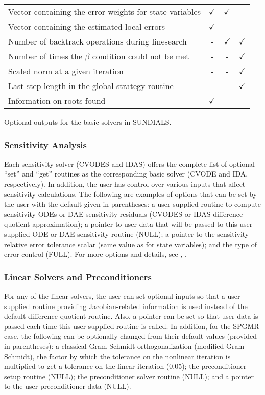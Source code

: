 \begin{acmtable}{327pt}
\begin{tabular}{p{2.75in} c c c }
Vector containing the error weights for state variables & $\checkmark$ & $\checkmark$ & - \\
Vector containing the estimated local errors & $\checkmark$ & - & - \\
Number of backtrack operations during linesearch & - & $\checkmark$ & $\checkmark$ \\
Number of times the $\beta$ condition could not be met & - & - & $\checkmark$ \\
Scaled norm at a given iteration & - & - & $\checkmark$ \\
Last step length in the global strategy routine & - & - & $\checkmark$ \\
Information on roots found & $\checkmark$ & - & - \\
\end{tabular}
\caption{Optional outputs for the basic solvers in SUNDIALS.}
\label{t:optional_output}
\end{acmtable}

\subsubsection*{Sensitivity Analysis}

Each sensitivity solver (CVODES and IDAS) offers the complete list of
optional ``set'' and ``get'' routines as the corresponding basic solver (CVODE
and IDA, respectively). In addition, the user has control over various
inputs that affect sensitivity calculations. 
The following are examples of options that can be set by the user
with the default given in parentheses: a user-supplied routine
to compute sensitivity ODEs or DAE sensitivity residuals (CVODES or
IDAS difference quotient approximation); a pointer to user data that
will be passed to this user-supplied ODE or DAE sensitivity routine (NULL); a
pointer to the sensitivity relative error tolerance scalar (same value as
for state variables); and the type of error control (FULL).
For more options and details, see \cite{SeHi:03}, \cite{HiSe:04cvodes}.

\subsubsection*{Linear Solvers and Preconditioners}

For any of the linear solvers, the user can set optional inputs so 
that a user-supplied routine providing Jacobian-related information
is used instead of the default difference quotient routine. 
Also, a pointer can be set so that user data is passed each time this
user-supplied routine is called. In addition, for the SPGMR case,
the following can be optionally changed from their default values
(provided in parentheses): a classical Gram-Schmidt orthogonalization 
(modified Gram-Schmidt), the factor by which the tolerance on the
nonlinear iteration is multiplied to get a tolerance on the linear
iteration (0.05); the preconditioner setup routine (NULL); the
preconditioner solver routine (NULL); and a pointer to the user
preconditioner data (NULL).

